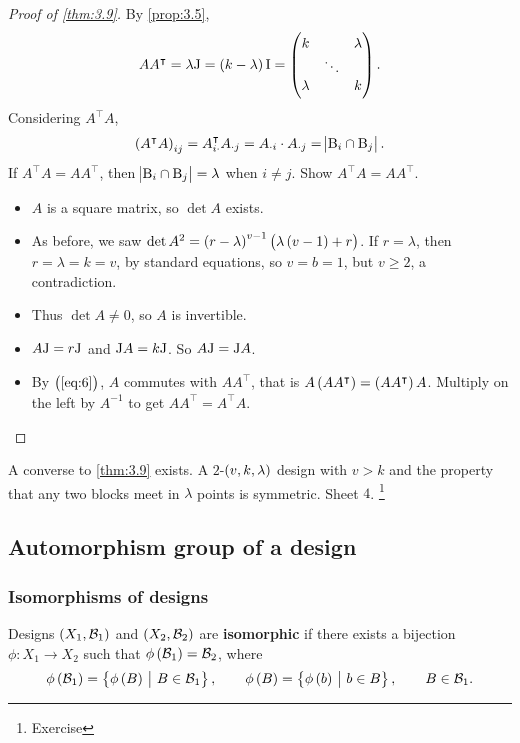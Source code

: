 \begin{proof}[Proof of \ref{thm:3.9}]
By \ref{prop:3.5},
\begin{equation}
\label{eq:6}
AA^\intercal = \lambda\J = \br{k - \lambda}\I = \threebythree{k}{}{\lambda}{}{\ddots}{}{\lambda}{}{k}.
\end{equation}
Considering $ A^\intercal A $,
$$ \br{A^\intercal A}_{ij} = A_{i\cdot}^\intercal A_{\cdot j} = A_{\cdot i} \cdot A_{\cdot j} = \abs{\B_i \cap \B_j}. $$
If $ A^\intercal A = AA^\intercal $, then $ \abs{\mathrm{B}_i \cap \mathrm{B}_j} = \lambda $ when $ i \ne j $. Show $ A^\intercal A = AA^\intercal $.
\begin{itemize}
\item $ A $ is a square matrix, so $ \det A $ exists.
\item As before, we saw $ \det A^2 = \br{r - \lambda}^{v - 1}\br{\lambda\br{v - 1} + r} $. If $ r = \lambda $, then $ r = \lambda = k = v $, by standard equations, so $ v = b = 1 $, but $ v \ge 2 $, a contradiction.
\item Thus $ \det A \ne 0 $, so $ A $ is invertible.
\item $ A\mathrm{J} = r\mathrm{J} $ and $ \mathrm{J} A = k\mathrm{J} $. So $ A\mathrm{J} = \mathrm{J} A $.
\item By $ \br{\ref{eq:6}} $, $ A $ commutes with $ AA^\intercal $, that is $ A\br{AA^\intercal} = \br{AA^\intercal}A $. Multiply on the left by $ A^{-1} $ to get $ AA^\intercal = A^\intercal A $.
\end{itemize}
\end{proof}

\begin{note*}
A converse to \ref{thm:3.9} exists. A $ 2 $-$ \br{v, k, \lambda} $ design with $ v > k $ and the property that any two blocks meet in $ \lambda $ points is symmetric. Sheet $ 4 $. \footnote{Exercise}
\end{note*}

\subsection{Automorphism group of a design}

\subsubsection{Isomorphisms of designs}

\begin{definition*}
Designs $ \br{X_1, \BBB_1} $ and $ \br{X_2, \BBB_2} $ are \textbf{isomorphic} if there exists a bijection $ \phi : X_1 \to X_2 $ such that $ \phi\br{\BBB_1} = \BBB_2 $, where
$$ \phi\br{\BBB_1} = \cbr{\phi\br{B} \st B \in \BBB_1}, \qquad \phi\br{B} = \cbr{\phi\br{b} \st b \in B}, \qquad B \in \BBB_1. $$
\end{definition*}

